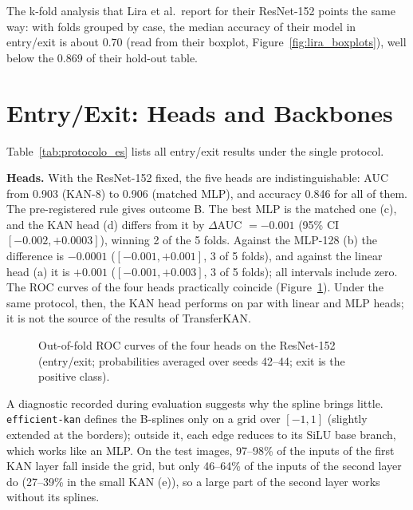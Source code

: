 The k-fold analysis that Lira et al.\ report for their ResNet-152 points the same way: with folds grouped by case, the median accuracy of their model in entry/exit is about 0.70 (read from their boxplot, Figure~\ref{fig:lira_boxplots}), well below the 0.869 of their hold-out table.


\section{Entry/Exit: Heads and Backbones}
\label{sec:results_entry_exit}

Table~\ref{tab:protocolo_es} lists all entry/exit results under the single protocol.



\textbf{Heads.} With the ResNet-152 fixed, the five heads are indistinguishable: AUC from 0.903 (KAN-8) to 0.906 (matched MLP), and accuracy 0.846 for all of them. The pre-registered rule gives outcome B. The best MLP is the matched one (c), and the KAN head (d) differs from it by $\Delta$AUC $= -0.001$ (95\% CI $[-0.002, +0.0003]$), winning 2 of the 5 folds. Against the MLP-128 (b) the difference is $-0.0001$ ($[-0.001, +0.001]$, 3 of 5 folds), and against the linear head (a) it is $+0.001$ ($[-0.001, +0.003]$, 3 of 5 folds); all intervals include zero. The ROC curves of the four heads practically coincide (Figure~\ref{fig:roc_es}). Under the same protocol, then, the KAN head performs on par with linear and MLP heads; it is not the source of the results of TransferKAN.

\begin{figure}[!htbp]
\centering

\caption{Out-of-fold ROC curves of the four heads on the ResNet-152 (entry/exit; probabilities averaged over seeds 42--44; exit is the positive class).}
\label{fig:roc_es}
\end{figure}

A diagnostic recorded during evaluation suggests why the spline brings little. \texttt{efficient-kan} defines the B-splines only on a grid over $[-1, 1]$ (slightly extended at the borders); outside it, each edge reduces to its SiLU base branch, which works like an MLP. On the test images, 97--98\% of the inputs of the first KAN layer fall inside the grid, but only 46--64\% of the inputs of the second layer do (27--39\% in the small KAN (e)), so a large part of the second layer works without its splines.

